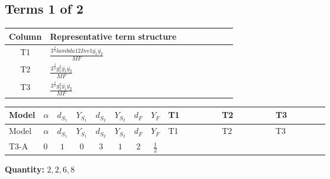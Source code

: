 \documentclass[8pt]{article}
\begin{document}
\begin{landscape}
\subsection*{Terms 1 of 2}
\begin{center}
\begin{tabular}{@{}c >{\raggedright\arraybackslash}p{0.82\linewidth}@{}}
\toprule
Column & Representative term structure \\
\midrule
T1 & \(\displaystyle \frac{3^{\frac{3}{4}} lambda12Inv1 \overline{y_{1}} \overline{y_{2}}}{MF}\) \\
\midrule
T2 & \(\displaystyle \frac{3^{\frac{3}{4}} g_{1}^{2} \overline{y_{1}} \overline{y_{2}}}{MF}\) \\
\midrule
T3 & \(\displaystyle \frac{3^{\frac{3}{4}} g_{2}^{2} \overline{y_{1}} \overline{y_{2}}}{MF}\) \\
\midrule
\bottomrule
\end{tabular}
\end{center}
\smallskip
\tiny
\begin{longtable}{@{}llcccccc >{\raggedright\arraybackslash}p{0.21\linewidth} >{\raggedright\arraybackslash}p{0.21\linewidth} >{\raggedright\arraybackslash}p{0.21\linewidth}@{}}
\toprule
Model & $\alpha$ & $d_{S_1}$ & $Y_{S_1}$ & $d_{S_2}$ & $Y_{S_2}$ & $d_F$ & $Y_F$ & T1 & T2 & T3 \\
\midrule
\endfirsthead
\toprule
Model & $\alpha$ & $d_{S_1}$ & $Y_{S_1}$ & $d_{S_2}$ & $Y_{S_2}$ & $d_F$ & $Y_F$ & T1 & T2 & T3 \\
\midrule
\endhead
T3-A & $0$ & $1$ & $0$ & $3$ & $1$ & $2$ & $\frac{1}{2}$ & \scriptsize\adjustbox{max width=\linewidth}{$\begin{gathered} \frac{3^{\frac{3}{4}} lambda12Inv1 \overline{y_{1}} \overline{y_{2}}}{6 MF}\end{gathered}$} & \scriptsize\adjustbox{max width=\linewidth}{$\begin{gathered} \frac{3^{\frac{3}{4}} g_{1}^{2} \overline{y_{1}} \overline{y_{2}}}{8 MF}\end{gathered}$} & \scriptsize\adjustbox{max width=\linewidth}{$\begin{gathered} \frac{17 \cdot 3^{\frac{3}{4}} g_{2}^{2} \overline{y_{1}} \overline{y_{2}}}{24 MF}\end{gathered}$} \\
\midrule
\bottomrule
\end{longtable}
\clearpage
\noindent\textbf{Quantity: }$\mathrm{2,2,6,8}$\par\smallskip

\end{landscape}
\end{document}
